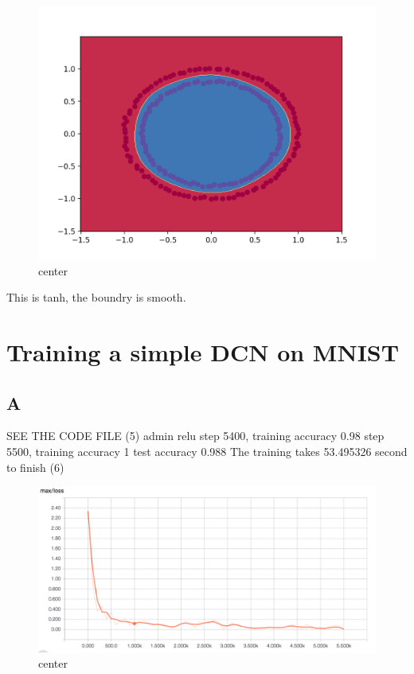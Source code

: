 \documentclass[12pt]{article}
\begin{document}
\begin{figure}[H]
  \caption{center}
  \centering
    \includegraphics[scale=0.2]{4layer6tanh.png}
\end{figure}
This is tanh, the boundry is smooth.






\section{Training a simple DCN on MNIST}
\subsection{A}
SEE THE CODE FILE
(5)
admin relu
step 5400, training accuracy 0.98
step 5500, training accuracy 1
test accuracy 0.988
The training takes 53.495326 second to finish
(6)
\begin{figure}[H]
  \caption{center}
  \centering
    \includegraphics[scale=0.4]{6lossmax.png}
\end{figure}
\end{document}

